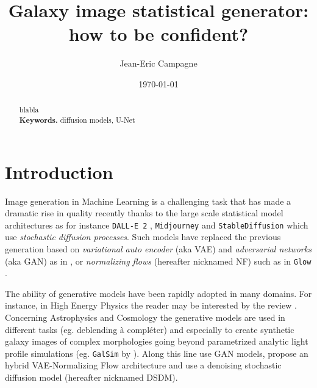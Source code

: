 \documentclass[11pt]{amsart}
\title{Galaxy image statistical generator: how to be confident?}
\author{Jean-Eric Campagne}
\date{\today}
\begin{document}
\maketitle
%
\begin{abstract}
blabla
\\
\smallskip
\noindent \textbf{Keywords.} diffusion models, U-Net
\end{abstract}

\section{Introduction}
\label{sec:Intro}
Image generation in Machine Learning is a challenging task that has made a dramatic rise in quality recently thanks to the large scale statistical model architectures as for instance \texttt{DALL-E 2} \citep{ramesh2022}, \texttt{Midjourney} \citep{Oppenlaender2022} and \texttt{StableDiffusion} \citep{Rombach2022} which use \textit{stochastic diffusion processes}. Such models have replaced the previous generation based on \textit{variational auto encoder} (aka VAE) \citep{Kingma2014} and  \textit{adversarial networks} (aka GAN) \citep{goodfellow2014generative} as in \citep{KarrasALL18}, or \textit{normalizing flows} (hereafter nicknamed NF) such as in \texttt{Glow} \citep{Kingma2018}. 


The ability of generative models have been rapidly adopted in many domains. For instance, in High Energy Physics the reader may be interested by the review \cite{PhysRevD.107.076017}. Concerning Astrophysics and Cosmology the generative models are used in different tasks (eg. deblending \citep{Hemmati_2022,Arcelin2020} {\color{red} à compléter}) and especially to create synthetic galaxy images of complex morphologies going beyond parametrized analytic light profile simulations (eg. \texttt{GalSim} by \cite{ROWE2015121}). Along this line \citep{ravanbakhsh2016,Fussell2019} use GAN models, \cite{Lanusse2021} propose an hybrid VAE-Normalizing Flow architecture and \cite{smith2021} use a denoising stochastic diffusion model (hereafter nicknamed DSDM). 
\end{document}
